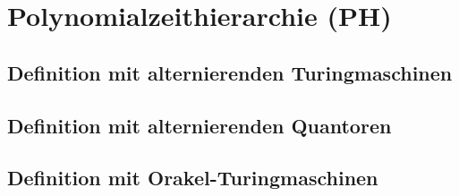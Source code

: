 \chapter{Polynomialzeithierarchie (PH)} \label{chapter: Polynomialzeithierarchie (PH)}

\section{Definition mit alternierenden Turingmaschinen} \label{section: Definition PH mit ATM}

\section{Definition mit alternierenden Quantoren} \label{section: Definition PH mit alternierenden Qunatoren}

\section{Definition mit Orakel-Turingmaschinen} \label{section: Definition PH mit Orakel-Turingmaschinen}
